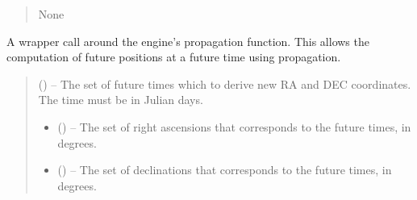 \documentclass[letterpaper,11pt,english]{sphinxmanual}
\begin{document}
\begin{savenotes}
\begin{fulllineitems}
\begin{savenotes}
\begin{fulllineitems}
\begin{quote}
\begin{description}
\begin{itemize}
\end{itemize}

\sphinxAtStartPar
None

\end{description}\end{quote}

\end{fulllineitems}\end{savenotes}


\begin{savenotes}\begin{fulllineitems}
\label{\detokenize{code/opihiexarata.propagate.solution:opihiexarata.propagate.solution.PropagativeSolution.forward_propagate}}
\pysigstartsignatures
{}
\pysigstopsignatures
\sphinxAtStartPar
A wrapper call around the engine’s propagation function. This
allows the computation of future positions at a future time using
propagation.
\begin{quote}\begin{description}
\sphinxAtStartPar
{} () – The set of future times which to derive new RA and DEC coordinates.
The time must be in Julian days.

\sphinxAtStartPar
\begin{itemize}
\item {} 
\sphinxAtStartPar
{} () – The set of right ascensions that corresponds to the future times,
in degrees.

\item {} 
\sphinxAtStartPar
{} () – The set of declinations that corresponds to the future times, in
degrees.

\end{itemize}


\end{description}\end{quote}

\end{fulllineitems}\end{savenotes}


\end{fulllineitems}\end{savenotes}
\end{document}
